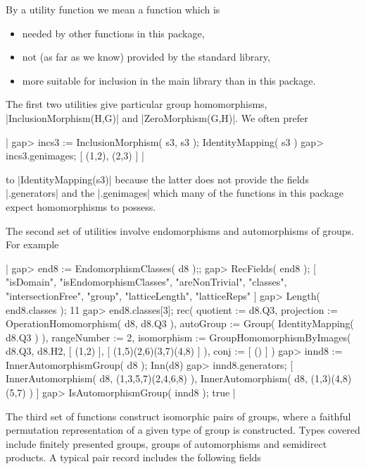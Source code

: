 {%


By a utility function we mean a {\GAP} function which is\:
\begin{itemize}
\item needed by other functions in this package,
\item not (as far as we know) provided by the standard {\GAP} library,
\item more suitable for inclusion in the main library than in this package.
\end{itemize}

The first two utilities give particular group homomorphisms,
|InclusionMorphism(H,G)| and |ZeroMorphism(G,H)|.
We often prefer

|    gap> incs3 := InclusionMorphism( s3, s3 );
    IdentityMapping( s3 )
    gap> incs3.genimages;
    [ (1,2), (2,3) ]  |

to |IdentityMapping(s3)| because the latter does not provide the fields
|.generators| and the |.genimages| which many of the functions in this
package expect homomorphisms to possess.

The second set of utilities involve endomorphisms and automorphisms of 
groups.  For example\:

|    gap> end8 := EndomorphismClasses( d8 );;
    gap> RecFields( end8 );
    [ "isDomain", "isEndomorphismClasses", "areNonTrivial", "classes",
      "intersectionFree", "group", "latticeLength", "latticeReps" ]
    gap> Length( end8.classes );
    11
    gap> end8.classes[3];
    rec(
      quotient := d8.Q3,
      projection := OperationHomomorphism( d8, d8.Q3 ),
      autoGroup := Group( IdentityMapping( d8.Q3 ) ),
      rangeNumber := 2,
      isomorphism := GroupHomomorphismByImages( d8.Q3, d8.H2, [ (1,2) ], 
        [ (1,5)(2,6)(3,7)(4,8) ] ),
      conj := [ () ] )
    gap> innd8 := InnerAutomorphismGroup( d8 );
    Inn(d8)
    gap> innd8.generators;
    [ InnerAutomorphism( d8, (1,3,5,7)(2,4,6,8) ), 
      InnerAutomorphism( d8, (1,3)(4,8)(5,7) ) ]
    gap> IsAutomorphismGroup( innd8 );
    true   |

The third set of functions construct isomorphic pairs of groups,
where a faithful permutation representation of a given type of group 
is constructed.  Types covered include finitely presented groups,
groups of automorphisms and semidirect products.  
A typical pair record includes the following fields\:

}
